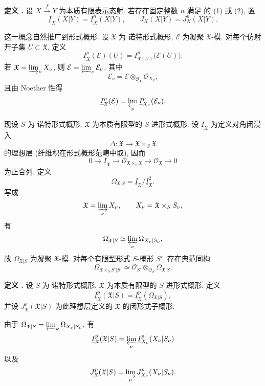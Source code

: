 
\medskip
\noindent\textbf{定义 .}
设 $X\xrightarrow{f}Y$ 为本质有限表示态射. 若存在固定整数 $n$ 满足  的 (1) 或 (2), 置
\[
\underline I_X(X|Y)=\underline I_X^n(X|Y),
\qquad
J_X(X|Y)=J_X^n(X|Y).
\]


这一概念自然推广到形式概形. 设 $\mathfrak X$ 为 诺特形式概形, $\mathcal E$ 为凝聚 $\mathfrak X$-模. 对每个仿射开子集 $U\subset\mathfrak X$, 定义
\[
\underline I_{\mathfrak X}^p(\mathcal E)(U)
=I_{\mathfrak X(U)}^p\bigl(\mathcal E(U)\bigr).
\]
若 $\mathfrak X=\varinjlim_\nu X_\nu$, 则 $\mathcal E=\varprojlim_\nu\mathcal E_\nu$, 其中
\[
\mathcal E_\nu
=\mathcal E\otimes_{\mathcal O_{\mathfrak X}}\mathcal O_{X_\nu},
\]
且由 Noether 性得
\[
\underline I_{\mathfrak X}^p(\mathcal E)
=\varprojlim_\nu\underline I_{X_\nu}^p(\mathcal E_\nu).
\]

现设 $S$ 为 诺特形式概形, $\mathfrak X$ 为本质有限型的 $S$-进形式概形. 设 $\underline I_{\mathfrak X}$ 为定义对角闭浸入
\[
\Delta:\mathfrak X\longrightarrow
\mathfrak X\times_S\mathfrak X
\]
的理想层 (纤维积在形式概形范畴中取), 因而
\[
0\longrightarrow\underline I_{\mathfrak X}
\longrightarrow\mathcal O_{\mathfrak X\times_S\mathfrak X}
\longrightarrow\mathcal O_{\mathfrak X}\longrightarrow0
\]
为正合列. 定义
\[
\Omega_{\mathfrak X|S}
=\underline I_{\mathfrak X}/\underline I_{\mathfrak X}^{2}.
\]
写成
\[
\mathfrak X=\varinjlim_\nu X_\nu,
\qquad X_\nu=\mathfrak X\times_SS_\nu,
\]
有
\[
\Omega_{\mathfrak X|S}
\simeq\varprojlim_\nu\Omega_{X_\nu|S_\nu},
\]
故 $\Omega_{\mathfrak X|S}$ 为凝聚 $\mathfrak X$-模. 对每个有限型形式 $S$-概形 $S'$, 存在典范同构
\[
\Omega_{\mathfrak X\times_SS'|S'}
\simeq
\mathcal O_{S'}\otimes_{\mathcal O_S}\Omega_{\mathfrak X|S}.
\]

\medskip
\noindent\textbf{定义 .}
设 $S$ 为 诺特形式概形, $\mathfrak X$ 为本质有限型的 $S$-进形式概形. 定义
\[
\underline I_{\mathfrak X}^p(\mathfrak X|S)
=\underline I_{\mathfrak X}^p(\Omega_{\mathfrak X|S}),
\]
并设 $J_{\mathfrak X}^p(\mathfrak X|S)$ 为此理想层定义的 $\mathfrak X$ 的闭形式子概形.

由于 $\Omega_{\mathfrak X|S}=\varprojlim_\nu\Omega_{X_\nu|S_\nu}$, 有
\[
\underline I_{\mathfrak X}^p(\mathfrak X|S)
=\varprojlim_\nu\underline I_{X_\nu}^p(X_\nu|S_\nu)
\]
以及
\[
J_{\mathfrak X}^p(\mathfrak X|S)
=\varinjlim_\nu J_{X_\nu}^p(X_\nu|S_\nu).
\]

